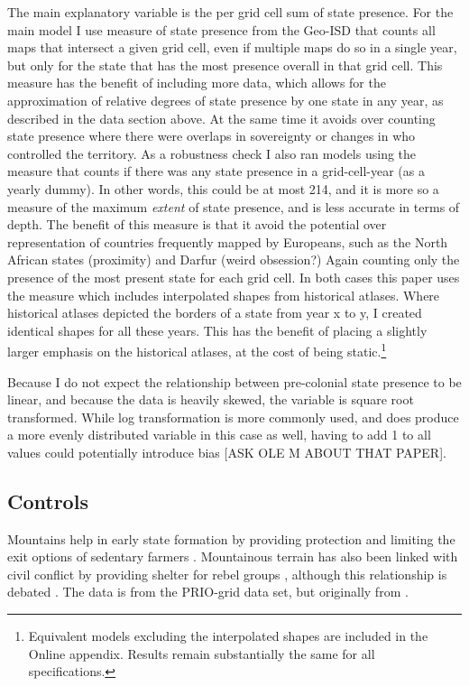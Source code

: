 \documentclass[12pt]{article}
\begin{document}
The main explanatory variable is the per grid cell sum of state presence. For
the main model I use measure of state presence from the Geo-ISD that counts all
maps that intersect a given grid cell, even if multiple maps do so in a single
year, but only for the state that has the most presence overall in that grid
cell. This measure has the benefit of including more data, which allows for the
approximation of relative degrees of state presence by one state in any year, as
described in the data section above. At the same time it avoids over counting
state presence where there were overlaps in sovereignty or changes in who
controlled the territory. As a robustness check I also ran models using the
measure that counts if there was any state presence in a grid-cell-year (as a
yearly dummy). In other words, this could be at most 214, and it is more so a
measure of the maximum \textit{extent} of state presence, and is less accurate
in terms of depth. The benefit of this measure is that it avoid the potential
over representation of countries frequently mapped by Europeans, such as the
North African states (proximity) and Darfur (weird obsession?) Again counting
only the presence of the most present state for each grid cell. In both cases
this paper uses the measure which includes interpolated shapes from historical
atlases. Where historical atlases depicted the borders of a state from year x to
y, I created identical shapes for all these years. This has the benefit of
placing a slightly larger emphasis on the historical atlases, at the cost of
being static.\footnote{Equivalent models excluding the interpolated shapes are
included in the Online appendix. Results remain substantially the same for all
specifications.}

Because I do not expect the relationship between pre-colonial state presence to
be linear, and because the data is heavily skewed, the variable is square root
transformed. While log transformation is more commonly used, and does produce a
more evenly distributed variable in this case as well, having to add 1 to
all values could potentially introduce bias [ASK OLE M ABOUT THAT PAPER]. 

\subsection{Controls}

Mountains help in early state formation by providing protection and limiting the
exit options of sedentary farmers \citep{Carneiro1988}. Mountainous terrain has
also been linked with civil conflict by providing shelter for rebel groups
\citep{Hegre2006}, although this relationship is debated 
\citep{Buhaug2002}. The data is from the PRIO-grid data set, but originally 
from \citet{Blyth2002}. 
\end{document}
